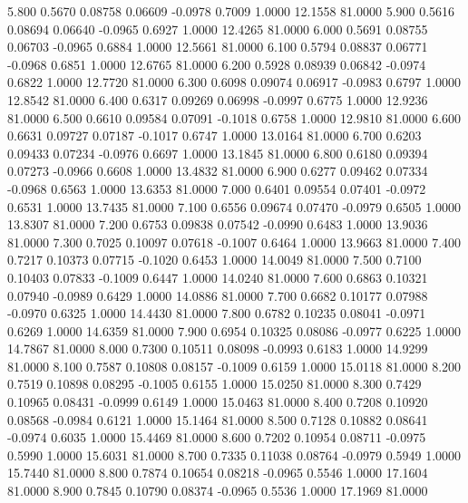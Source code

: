    5.800   0.5670   0.08758   0.06609  -0.0978   0.7009   1.0000  12.1558  81.0000
   5.900   0.5616   0.08694   0.06640  -0.0965   0.6927   1.0000  12.4265  81.0000
   6.000   0.5691   0.08755   0.06703  -0.0965   0.6884   1.0000  12.5661  81.0000
   6.100   0.5794   0.08837   0.06771  -0.0968   0.6851   1.0000  12.6765  81.0000
   6.200   0.5928   0.08939   0.06842  -0.0974   0.6822   1.0000  12.7720  81.0000
   6.300   0.6098   0.09074   0.06917  -0.0983   0.6797   1.0000  12.8542  81.0000
   6.400   0.6317   0.09269   0.06998  -0.0997   0.6775   1.0000  12.9236  81.0000
   6.500   0.6610   0.09584   0.07091  -0.1018   0.6758   1.0000  12.9810  81.0000
   6.600   0.6631   0.09727   0.07187  -0.1017   0.6747   1.0000  13.0164  81.0000
   6.700   0.6203   0.09433   0.07234  -0.0976   0.6697   1.0000  13.1845  81.0000
   6.800   0.6180   0.09394   0.07273  -0.0966   0.6608   1.0000  13.4832  81.0000
   6.900   0.6277   0.09462   0.07334  -0.0968   0.6563   1.0000  13.6353  81.0000
   7.000   0.6401   0.09554   0.07401  -0.0972   0.6531   1.0000  13.7435  81.0000
   7.100   0.6556   0.09674   0.07470  -0.0979   0.6505   1.0000  13.8307  81.0000
   7.200   0.6753   0.09838   0.07542  -0.0990   0.6483   1.0000  13.9036  81.0000
   7.300   0.7025   0.10097   0.07618  -0.1007   0.6464   1.0000  13.9663  81.0000
   7.400   0.7217   0.10373   0.07715  -0.1020   0.6453   1.0000  14.0049  81.0000
   7.500   0.7100   0.10403   0.07833  -0.1009   0.6447   1.0000  14.0240  81.0000
   7.600   0.6863   0.10321   0.07940  -0.0989   0.6429   1.0000  14.0886  81.0000
   7.700   0.6682   0.10177   0.07988  -0.0970   0.6325   1.0000  14.4430  81.0000
   7.800   0.6782   0.10235   0.08041  -0.0971   0.6269   1.0000  14.6359  81.0000
   7.900   0.6954   0.10325   0.08086  -0.0977   0.6225   1.0000  14.7867  81.0000
   8.000   0.7300   0.10511   0.08098  -0.0993   0.6183   1.0000  14.9299  81.0000
   8.100   0.7587   0.10808   0.08157  -0.1009   0.6159   1.0000  15.0118  81.0000
   8.200   0.7519   0.10898   0.08295  -0.1005   0.6155   1.0000  15.0250  81.0000
   8.300   0.7429   0.10965   0.08431  -0.0999   0.6149   1.0000  15.0463  81.0000
   8.400   0.7208   0.10920   0.08568  -0.0984   0.6121   1.0000  15.1464  81.0000
   8.500   0.7128   0.10882   0.08641  -0.0974   0.6035   1.0000  15.4469  81.0000
   8.600   0.7202   0.10954   0.08711  -0.0975   0.5990   1.0000  15.6031  81.0000
   8.700   0.7335   0.11038   0.08764  -0.0979   0.5949   1.0000  15.7440  81.0000
   8.800   0.7874   0.10654   0.08218  -0.0965   0.5546   1.0000  17.1604  81.0000
   8.900   0.7845   0.10790   0.08374  -0.0965   0.5536   1.0000  17.1969  81.0000

